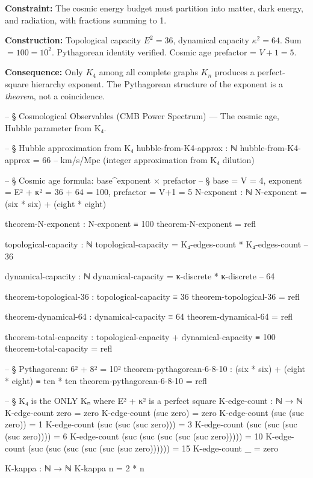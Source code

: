 \documentclass[11pt,a4paper]{book}
\begin{document}
\textbf{Constraint:} The cosmic energy budget must partition into matter, dark energy, and radiation, with fractions summing to 1.

\textbf{Construction:} Topological capacity $E^2 = 36$, dynamical capacity $\kappa^2 = 64$. Sum $= 100 = 10^2$. Pythagorean identity verified. Cosmic age prefactor = $V + 1 = 5$.

\textbf{Consequence:} Only $K_4$ among all complete graphs $K_n$ produces a perfect-square hierarchy exponent. The Pythagorean structure of the exponent is a \emph{theorem}, not a coincidence.

\begin{code}
-- § Cosmological Observables (CMB Power Spectrum) — The cosmic age, Hubble parameter from K₄.

-- § Hubble approximation from K₄
hubble-from-K4-approx : ℕ
hubble-from-K4-approx = 66  -- km/s/Mpc (integer approximation from K₄ dilution)

-- § Cosmic age formula: base^exponent × prefactor
-- § base = V = 4, exponent = E² + κ² = 36 + 64 = 100, prefactor = V+1 = 5
N-exponent : ℕ
N-exponent = (six * six) + (eight * eight)

theorem-N-exponent : N-exponent ≡ 100
theorem-N-exponent = refl

topological-capacity : ℕ
topological-capacity = K₄-edges-count * K₄-edges-count  -- 36

dynamical-capacity : ℕ
dynamical-capacity = κ-discrete * κ-discrete  -- 64

theorem-topological-36 : topological-capacity ≡ 36
theorem-topological-36 = refl

theorem-dynamical-64 : dynamical-capacity ≡ 64
theorem-dynamical-64 = refl

theorem-total-capacity : topological-capacity + dynamical-capacity ≡ 100
theorem-total-capacity = refl

-- § Pythagorean: 6² + 8² = 10²
theorem-pythagorean-6-8-10 : (six * six) + (eight * eight) ≡ ten * ten
theorem-pythagorean-6-8-10 = refl

-- § K₄ is the ONLY Kₙ where E² + κ² is a perfect square
K-edge-count : ℕ → ℕ
K-edge-count zero = zero
K-edge-count (suc zero) = zero
K-edge-count (suc (suc zero)) = 1
K-edge-count (suc (suc (suc zero))) = 3
K-edge-count (suc (suc (suc (suc zero)))) = 6
K-edge-count (suc (suc (suc (suc (suc zero))))) = 10
K-edge-count (suc (suc (suc (suc (suc (suc zero)))))) = 15
K-edge-count _ = zero

K-kappa : ℕ → ℕ
K-kappa n = 2 * n


\end{code}
\end{document}
